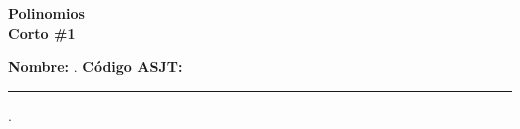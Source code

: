 \begin{center} \textbf
{
    \Large Polinomios \\ \vspace{2mm}Corto \#1
}
\end{center}

\textbf{Nombre:} \hrulefill. \textbf{ Código ASJT:} \rule{2cm}{0.1mm}.
\vspace{-4mm}

